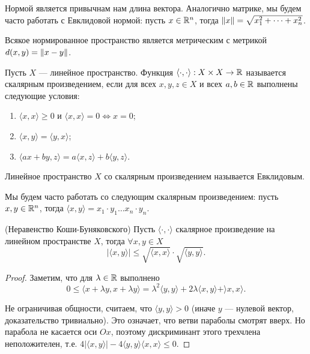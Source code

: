 \documentclass[a4paper]{article}
\theoremstyle{named}
\begin{document}
        Нормой является привычнам нам длина вектора. Аналогично матрике, мы будем часто работать с Евклидовой нормой: пусть $x \in \mathbb{R}^n$, тогда $\left\lVert x\right\rVert = \sqrt{x_1^2 + \dots + x_n^2}$.

        Всякое нормированное пространство является метрическим с метрикой $d(x, y) = \left\lVert x - y\right\rVert$.

        \begin{definition*}
            Пусть $X$ --- линейное пространство. Функция $\langle \cdot, \cdot \rangle: X \times X \to \mathbb{R}$ называется скалярным произведением, если для всех $x, y, z \in X$ и всех $a, b \in \mathbb{R}$ выполнены следующие условия:
            \begin{enumerate}
            \item $\langle x, x \rangle \geq 0$ и $\langle x, x \rangle = 0 \iff x = 0$;
            \item $\langle x, y \rangle = \langle y, x \rangle$;
            \item $\langle ax + by, z \rangle = a \langle x, z \rangle + b \langle y, z \rangle$.
            \end{enumerate}

            Линейное пространство $X$ со скалярным произведением называется Евклидовым.
        \end{definition*}

        Мы будем часто работать со следующим скалярным произведением: пусть $x, y \in \mathbb{R}^n$, тогда $\langle x, y \rangle = x_1 \cdot y_1 \dots x_n \cdot y_n$.

        \begin{lemma*} (Неравенство Коши-Буняковского) 
            Пусть $\langle \cdot, \cdot \rangle$ скалярное произведение на линейном пространстве $X$, тогда $\forall x, y \in X$
            \begin{equation*}
                |\langle x, y \rangle| \leq \sqrt{\langle x, x \rangle} \cdot \sqrt{\langle y, y \rangle}.
            \end{equation*}
        \end{lemma*}

        \begin{proof}
            Заметим, что для $\lambda \in \mathbb{R}$ выполнено
            \begin{equation*}
                0 \leq \langle x + \lambda y, x + \lambda y \rangle = \lambda^2 \langle y, y \rangle + 2\lambda \langle x, y \rangle + \rangle x, x \rangle.
            \end{equation*}

            Не ограничивая общности, считаем, что $\langle y, y \rangle > 0$ (иначе $y$ --- нулевой вектор, доказательство тривиально). Это означает, что ветви параболы смотрят вверх. Но парабола не касается оси $Ox$, поэтому дискриминант этого трехчлена неположителен, т.е. $4|\langle x, y \rangle| - 4\langle y, y \rangle \langle x, x \rangle \leq 0$.
        \end{proof}
\end{document}
